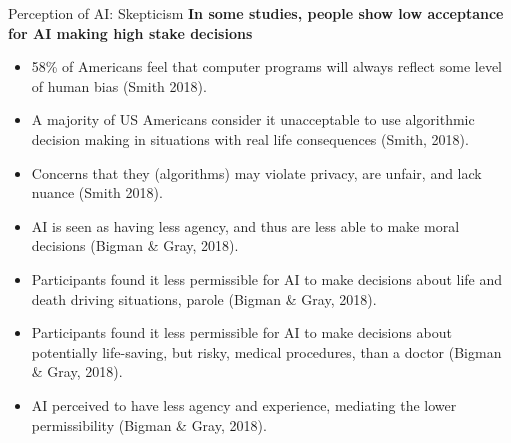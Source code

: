 \documentclass[8pt]{beamer}
\begin{document}
	\begin{frame}[t]{Perception of AI: Skepticism}
		\textbf{In some studies, people show low acceptance for AI making high stake decisions}
		\begin{itemize}
			\item 58\% of Americans feel that computer programs will always reflect some level of human bias (Smith 2018).
			\item A majority of US Americans consider it unacceptable to use algorithmic decision making in situations with real life consequences (Smith, 2018).
			\item Concerns that they (algorithms) may violate privacy, are unfair, and lack nuance (Smith 2018).
			\item <2> AI is seen as having less agency, and thus are less able to make moral decisions (Bigman \& Gray, 2018).
			\item <2> Participants found it less permissible for AI to make decisions about life and death driving situations, parole (Bigman \& Gray, 2018).
			\item <2> Participants found it less permissible for AI to make decisions about potentially life-saving, but risky, medical procedures, than a doctor (Bigman \& Gray, 2018).
			\item <2> AI perceived to have less agency and experience, mediating the lower permissibility (Bigman \& Gray, 2018).
		\end{itemize}
	\end{frame}
\end{document}
